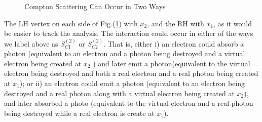 \begin{figure}[H]

    \caption{Compton Scattering Can Occur in Two Ways}
    \label{fig:compton-scattering}
\end{figure}
The LH vertex on each side of Fig.(\ref{fig:compton-scattering}) with $x_2$, and the RH with $x_1$, as it would be easier to track the analysis. The interaction could occur in either of the ways we label above as $S_{C 1}^{(2)}$ or $S_{C 2}^{(2)} .$ That is, either i) an electron could absorb a photon (equivalent to an electron and a photon being destroyed and a virtual electron being created at $x_{2}$ ) and later emit a photon(equivalent to the virtual electron being destroyed and both a real electron and a real photon being created at $x_1$); or ii) an electron could emit a photon (equivalent to an electron being destroyed and a real photon along with a virtual electron being created at $x_2$), and later absorbed a photo (equivalent to the virtual electron and a real photon being destroyed while a real electron is create at $x_1$).

